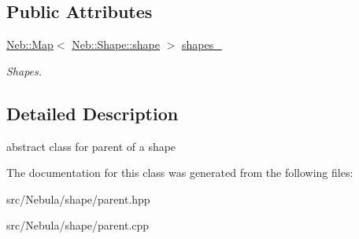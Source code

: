 \subsection*{\-Public \-Attributes}
\begin{DoxyCompactItemize}
\item 
\hypertarget{classNeb_1_1Shape_1_1parent_a3e3a76d97c48563a9fba680195795787}{\hyperlink{classNeb_1_1Map}{\-Neb\-::\-Map}$<$ \hyperlink{classNeb_1_1Shape_1_1shape}{\-Neb\-::\-Shape\-::shape} $>$ \hyperlink{classNeb_1_1Shape_1_1parent_a3e3a76d97c48563a9fba680195795787}{shapes\-\_\-}}\label{classNeb_1_1Shape_1_1parent_a3e3a76d97c48563a9fba680195795787}

\begin{DoxyCompactList}\small\item\em \-Shapes. \end{DoxyCompactList}\end{DoxyCompactItemize}


\subsection{\-Detailed \-Description}
abstract class for parent of a shape 

\-The documentation for this class was generated from the following files\-:\begin{DoxyCompactItemize}
\item 
src/\-Nebula/shape/parent.\-hpp\item 
src/\-Nebula/shape/parent.\-cpp\end{DoxyCompactItemize}
